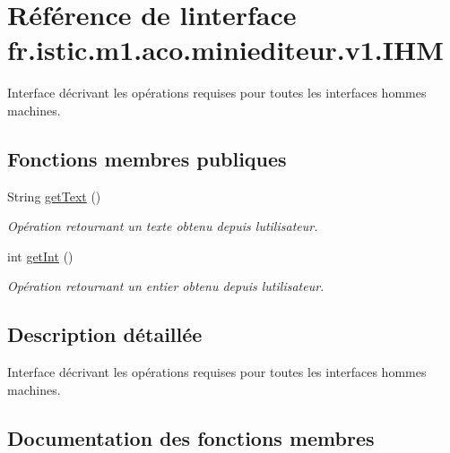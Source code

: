 \hypertarget{interfacefr_1_1istic_1_1m1_1_1aco_1_1miniediteur_1_1v1_1_1IHM}{}\section{Référence de l\textquotesingle{}interface fr.\+istic.\+m1.\+aco.\+miniediteur.\+v1.\+I\+HM}
\label{interfacefr_1_1istic_1_1m1_1_1aco_1_1miniediteur_1_1v1_1_1IHM}


Interface décrivant les opérations requises pour toutes les interfaces hommes machines.  


\subsection*{Fonctions membres publiques}
\begin{DoxyCompactItemize}
\item 
String \hyperlink{interfacefr_1_1istic_1_1m1_1_1aco_1_1miniediteur_1_1v1_1_1IHM_a3a2eaf2d7c5d0fa8f2de907c54f3e59b}{get\+Text} ()
\begin{DoxyCompactList}\small\item\em Opération retournant un texte obtenu depuis l\textquotesingle{}utilisateur. \end{DoxyCompactList}\item 
int \hyperlink{interfacefr_1_1istic_1_1m1_1_1aco_1_1miniediteur_1_1v1_1_1IHM_af00142fae9bec9cb8ff9920436d6986f}{get\+Int} ()
\begin{DoxyCompactList}\small\item\em Opération retournant un entier obtenu depuis l\textquotesingle{}utilisateur. \end{DoxyCompactList}\end{DoxyCompactItemize}


\subsection{Description détaillée}
Interface décrivant les opérations requises pour toutes les interfaces hommes machines. 

\subsection{Documentation des fonctions membres}
\mbox{\label{interfacefr_1_1istic_1_1m1_1_1aco_1_1miniediteur_1_1v1_1_1IHM_af00142fae9bec9cb8ff9920436d6986f}} 
